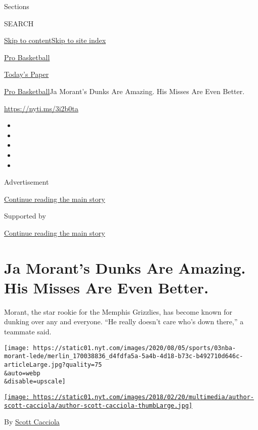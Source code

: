 Sections

SEARCH

\protect\hyperlink{site-content}{Skip to
content}\protect\hyperlink{site-index}{Skip to site index}

\href{https://www.nytimes.com/section/sports/basketball}{Pro Basketball}

\href{https://myaccount.nytimes.com/auth/login?response_type=cookie\&client_id=vi}{}

\href{https://www.nytimes.com/section/todayspaper}{Today's Paper}

\href{/section/sports/basketball}{Pro Basketball}\textbar{}Ja Morant's
Dunks Are Amazing. His Misses Are Even Better.

\url{https://nyti.ms/3i2b0ta}

\begin{itemize}
\item
\item
\item
\item
\item
\end{itemize}

Advertisement

\protect\hyperlink{after-top}{Continue reading the main story}

Supported by

\protect\hyperlink{after-sponsor}{Continue reading the main story}

\hypertarget{ja-morants-dunks-are-amazing-his-misses-are-even-better}{%
\section{Ja Morant's Dunks Are Amazing. His Misses Are Even
Better.}\label{ja-morants-dunks-are-amazing-his-misses-are-even-better}}

Morant, the star rookie for the Memphis Grizzlies, has become known for
dunking over any and everyone. ``He really doesn't care who's down
there,'' a teammate said.

\texttt{[image: https://static01.nyt.com/images/2020/08/05/sports/03nba-morant-lede/merlin\_170038836\_d4fdfa5a-5a4b-4d18-b73c-b492710d646c-articleLarge.jpg?quality=75\\\&auto=webp\\\&disable=upscale]}

\href{https://www.nytimes.com/by/scott-cacciola}{\texttt{[image: https://static01.nyt.com/images/2018/02/20/multimedia/author-scott-cacciola/author-scott-cacciola-thumbLarge.jpg]}}

By \href{https://www.nytimes.com/by/scott-cacciola}{Scott Cacciola}

